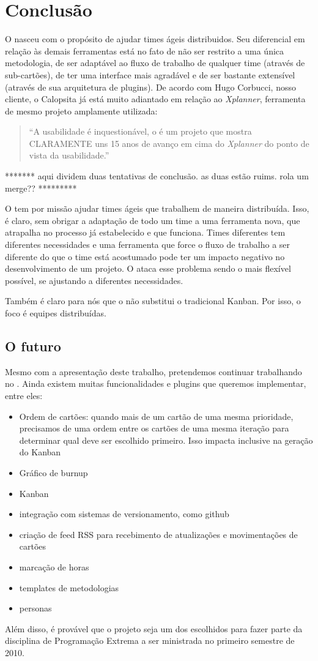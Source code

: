 \section{Conclusão}

O \calopsita{} nasceu com o propósito de ajudar times ágeis distribuidos. Seu diferencial em relação às demais ferramentas está no fato de não ser restrito a uma única metodologia, de ser adaptável ao fluxo de trabalho de qualquer time (através de sub-cartões), de ter uma interface mais agradável e de ser bastante extensível (através de sua arquitetura de plugins). De acordo com Hugo Corbucci, nosso cliente, o Calopsita já está muito adiantado em relação ao \textit{Xplanner}, ferramenta de mesmo projeto amplamente utilizada:

\begin{quote}
``A usabilidade é inquestionável, o \calopsita{} é um projeto que mostra CLARAMENTE uns 15 anos de avanço em cima do \textit{Xplanner} do ponto de vista da usabilidade.''
\end{quote}

******* aqui dividem duas tentativas de conclusão. as duas estão ruims. rola um merge?? *********

O \calopsita{} tem por missão ajudar times ágeis que trabalhem de maneira distribuída. Isso, é claro, sem obrigar a adaptação de todo um time a uma ferramenta nova, que atrapalha no processo já estabelecido e que funciona. Times diferentes tem diferentes necessidades e uma ferramenta que force o fluxo de trabalho a ser diferente do que o time está acostumado pode ter um impacto negativo no desenvolvimento de um projeto. O \calopsita{} ataca esse problema sendo o mais flexível possível, se ajustando a diferentes necessidades.

Também é claro para nós que o \calopsita{} não substitui o tradicional Kanban. Por isso, o foco é equipes distribuídas.


\subsection{O futuro}

Mesmo com a apresentação deste trabalho, pretendemos continuar trabalhando no \calopsita{}. Ainda existem muitas funcionalidades e plugins que queremos implementar, entre eles:

\begin{itemize}
	\item{Ordem de cartões: quando mais de um cartão de uma mesma prioridade, precisamos de uma ordem entre os cartões de uma mesma iteração para determinar qual deve ser escolhido primeiro. Isso impacta inclusive na geração do Kanban}
	\item{Gráfico de burnup}
	\item{Kanban}
	\item{integração com sistemas de versionamento, como github}
	\item{criação de feed RSS para recebimento de atualizações e movimentações de cartões}
	\item{marcação de horas}
	\item{templates de metodologias}
	\item{personas}
\end{itemize}

Além disso, é provável que o projeto seja um dos escolhidos para fazer parte da disciplina de Programação Extrema a ser ministrada no primeiro semestre de 2010.
